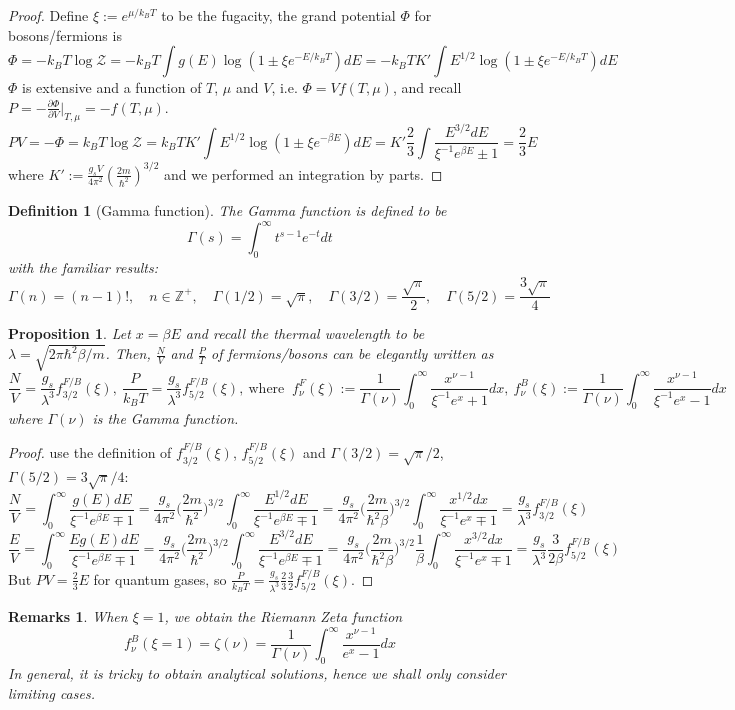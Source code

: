 \documentclass[a4paper]{article}
\newtheorem{remarks}{Remarks}[section]
\theoremstyle{new}
\newtheorem{defi}{Definition}[section]
\newtheorem{prop}{Proposition}[section]
\begin{document}
\begin{proof}
Define $\xi:=e^{\mu/k_BT}$ to be the fugacity, the grand potential $\Phi$ for bosons/fermions is
$$\Phi=-k_BT\log\mathcal{Z}=-k_BT\int g(E)\log(1\pm\xi e^{-E/k_BT})dE=-k_BTK'\int E^{1/2}\log(1\pm\xi e^{-E/k_BT})dE$$
$\Phi$ is extensive and a function of $T$, $\mu$ and $V$, i.e. $\Phi=Vf(T,\mu)$, and recall $P=-\frac{\partial\Phi}{\partial V}|_{T,\mu}=-f(T,\mu)$. 
$$PV=-\Phi=k_BT\log\mathcal{Z}=k_BTK'\int E^{1/2}\log(1\pm\xi e^{-\beta E})dE=K'\frac{2}{3}\int\frac{E^{3/2}dE}{\xi^{-1}e^{\beta E}\pm1}=\frac{2}{3}E$$
where $K':=\frac{g_sV}{4\pi^2}(\frac{2m}{\hbar^2})^{3/2}$ and we performed an integration by parts.
\end{proof}
\begin{defi}[Gamma function]
The Gamma function is defined to be
\begin{equation}
\Gamma(s)=\int_0^\infty t^{s-1}e^{-t}dt\label{Gamma}
\end{equation}
with the familiar results:
$$\Gamma(n)=(n-1)!,\quad n\in\mathbb{Z}^+,\quad\Gamma(1/2)=\sqrt{\pi},\quad\Gamma(3/2)=\frac{\sqrt{\pi}}{2},\quad\Gamma(5/2)=\frac{3\sqrt{\pi}}{4}$$
\end{defi}
\begin{prop}
Let $x=\beta E$ and recall the thermal wavelength to be $\lambda=\sqrt{2\pi\hbar^2\beta/m}$. Then, $\frac{N}{V}$ and $\frac{P}{T}$ of fermions/bosons can be elegantly written as
\begin{equation}
\frac{N}{V}=\frac{g_s}{\lambda^3}f_{3/2}^{F/B}(\xi),~\frac{P}{k_BT}=\frac{g_s}{\lambda^3}f_{5/2}^{F/B}(\xi),~\text{where }~f_\nu^F(\xi):=\frac{1}{\Gamma(\nu)}\int_0^\infty\frac{x^{\nu-1}}{\xi^{-1}e^x+1}dx,~f_\nu^B(\xi):=\frac{1}{\Gamma(\nu)}\int_0^\infty\frac{x^{\nu-1}}{\xi^{-1}e^x-1}dx\label{bosonsfermions4}
\end{equation}
where $\Gamma(\nu)$ is the Gamma function.
\end{prop}
\begin{proof}
use the definition of $f_{3/2}^{F/B}(\xi)$, $f_{5/2}^{F/B}(\xi)$ and $\Gamma(3/2)=\sqrt{\pi}/2$, $\Gamma(5/2)=3\sqrt{\pi}/4$:
$$\frac{N}{V}=\int_0^\infty\frac{g(E)dE}{\xi^{-1}e^{\beta E}\mp 1}=\frac{g_s}{4\pi^2}\bigg(\frac{2m}{\hbar^2}\bigg)^{3/2}\int_0^\infty\frac{E^{1/2}dE}{\xi^{-1}e^{\beta E}\mp 1}=\frac{g_s}{4\pi^2}\bigg(\frac{2m}{\hbar^2\beta}\bigg)^{3/2}\int_0^\infty\frac{x^{1/2}dx}{\xi^{-1}e^x\mp 1}=\frac{g_s}{\lambda^3}f_{3/2}^{F/B}(\xi)$$
$$\frac{E}{V}=\int_0^\infty\frac{Eg(E)dE}{\xi^{-1}e^{\beta E}\mp 1}=\frac{g_s}{4\pi^2}\bigg(\frac{2m}{\hbar^2}\bigg)^{3/2}\int_0^\infty\frac{E^{3/2}dE}{\xi^{-1}e^{\beta E}\mp 1}=\frac{g_s}{4\pi^2}\bigg(\frac{2m}{\hbar^2\beta}\bigg)^{3/2}\frac{1}{\beta}\int_0^\infty\frac{x^{3/2}dx}{\xi^{-1}e^x\mp 1}=\frac{g_s}{\lambda^3}\frac{3}{2\beta}f_{5/2}^{F/B}(\xi)$$
But $PV=\frac{2}{3}E$ for quantum gases, so $\frac{P}{k_BT}=\frac{g_s}{\lambda^3}\frac{2}{3}\frac{3}{2}f_{5/2}^{F/B}(\xi)$.
\end{proof}
\begin{remarks}
When $\xi=1$, we obtain the Riemann Zeta function
$$f_\nu^B(\xi=1)=\zeta(\nu)=\frac{1}{\Gamma(\nu)}\int_0^\infty\frac{x^{\nu-1}}{e^x-1}dx$$
In general, it is tricky to obtain analytical solutions, hence we shall only consider limiting cases.
\end{remarks}
\end{document}
